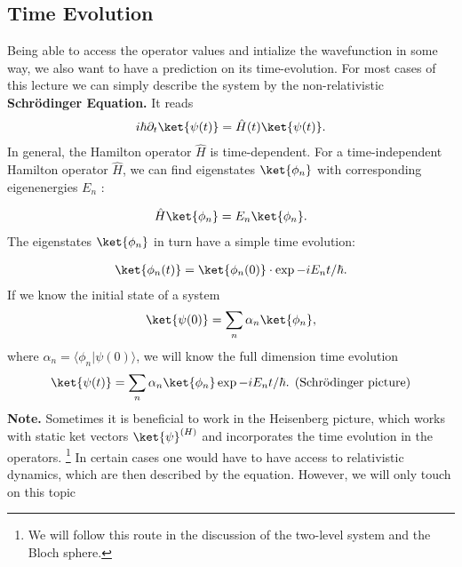 \subsection{Time Evolution}
Being able to access the operator values and intialize the wavefunction in some way, we also want to have a prediction on its time-evolution. For most cases of this lecture we can simply describe the system by the non-relativistic \textbf{Schrödinger Equation.} It reads
\begin{align}
i\hbar\partial_t\ket{\psi(t)}=\hat{H}(t)\ket{\psi(t)}.
\end{align}
In general, the Hamilton operator $\hat{H}$ is time-dependent. For a time-independent Hamilton operator $\hat{H}$, we can find eigenstates $\ket{\phi_n}$ with corresponding eigenenergies $E_n$ :

\begin{align}
\hat{H}\ket{\phi_n}=E_n\ket{\phi_n}.
\end{align}
The eigenstates $\ket{\phi_n}$ in turn have a simple time evolution:

\begin{align}
    \ket{\phi_n(t)}=\ket{\phi_n(0)}\cdot \exp{-i E_nt/\hbar}.
\end{align}
If we know the initial state of a system
\begin{align}
\ket{\psi(0)}=\sum_n \alpha_n\ket{\phi_n},
\end{align}
where $\alpha_n=\langle\phi_n | \psi(0)\rangle$, we will know the full dimension time evolution
\begin{align}
\ket{\psi(t)}=\sum_n\alpha_n\ket{\phi_n}\exp{-i E_n t/\hbar}. \;\, \text{(Schrödinger picture)}
\end{align}
\textbf{Note.} Sometimes it is beneficial to work in the Heisenberg picture, which works with static ket vectors $\ket{\psi}^{(H)}$ and incorporates the time evolution in the operators. \footnote{We will follow this route in the discussion of the two-level system and the Bloch sphere.}
In certain cases one would have to have access to relativistic dynamics, which are then described by the \textbfDirac equation. However, we will only touch on this topic 
